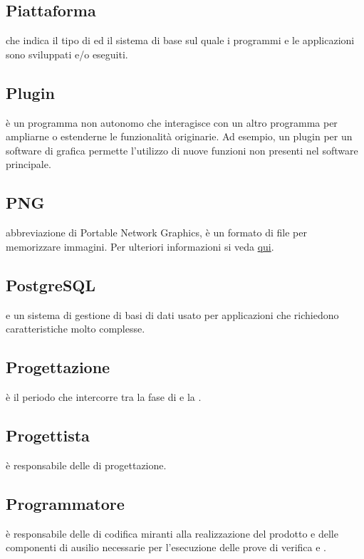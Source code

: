\documentclass[12pt,a4paper]{article}
\begin{document}
\subsection{Piattaforma} 
 che indica il tipo di  ed il sistema  di base sul quale i programmi e le applicazioni sono sviluppati e/o eseguiti.

\subsection{Plugin}
è un programma non autonomo che interagisce con un altro programma per ampliarne o estenderne le funzionalità originarie. Ad esempio, un plugin per un software di grafica permette l'utilizzo di nuove funzioni non presenti nel software principale.

\subsection{PNG} 
 abbreviazione di Portable Network Graphics, è un formato di file per memorizzare immagini. Per ulteriori informazioni si veda \href{http://it.wikipedia.org/wiki/Portable_Network_Graphics}{qui}.

\subsection{PostgreSQL} 
 e un sistema di gestione di basi di dati  usato per applicazioni che richiedono caratteristiche molto complesse.

\subsection{Progettazione} 
 è il periodo che intercorre tra la fase di \FAD e la \RP.

\subsection{Progettista} 
 è responsabile delle  di progettazione.

\subsection{Programmatore} 
 è responsabile delle  di codifica miranti alla realizzazione del prodotto e delle componenti di ausilio necessarie per l'esecuzione delle prove di verifica e .
\end{document}
